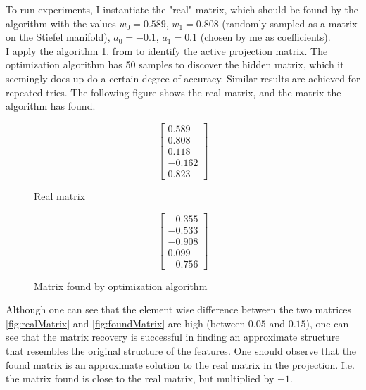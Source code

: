 To run experiments, I instantiate the "real" matrix, which should be found by the algorithm with the values $w_0 = 0.589$, $w_1 = 0.808$ (randomly sampled as a matrix on the Stiefel manifold), $a_0 = -0.1$, $a_1 = 0.1$ (chosen by me as coefficients). \\

I apply the algorithm 1. from \citep{Tripathy} to identify the active projection matrix.
The optimization algorithm has 50 samples to discover the hidden matrix, which it seemingly does up do a certain degree of accuracy.
Similar results are achieved for repeated tries.
The following figure shows the real matrix, and the matrix the algorithm has found.

\def\realW{
\begin{bmatrix}
	0.589 \\
    0.808 \\
	0.118 \\
	-0.162 \\
	0.823
\end{bmatrix}}

\def\okW1{
\begin{bmatrix}
	-0.355 \\
    	-0.533 \\
    	-0.908 \\
    	0.099 \\
    -0.756 
\end{bmatrix}}

\begin{figure}[h] 
\begin {minipage}{0.47\textwidth}
  \centering
  \begin{equation} \label{fig:realMatrix}
    \realW
  \end{equation}
  \caption{Real matrix}
\end{minipage}
\hfill
\begin {minipage}{0.47\textwidth}
  \centering
  \begin{equation} \label{fig:foundMatrix}
    \okW1
  \end{equation}
  \caption{Matrix found by optimization algorithm}
\end{minipage}
\end{figure}

Although one can see that the element wise difference between the two matrices \ref{fig:realMatrix} and \ref{fig:foundMatrix} are high (between $0.05$ and $0.15$), one can see that the matrix recovery is successful in finding an approximate structure that resembles the original structure of the features.
One should observe that the found matrix is an approximate solution to the real matrix in the projection. I.e. the matrix found is close to the real matrix, but multiplied by $-1$. \\

